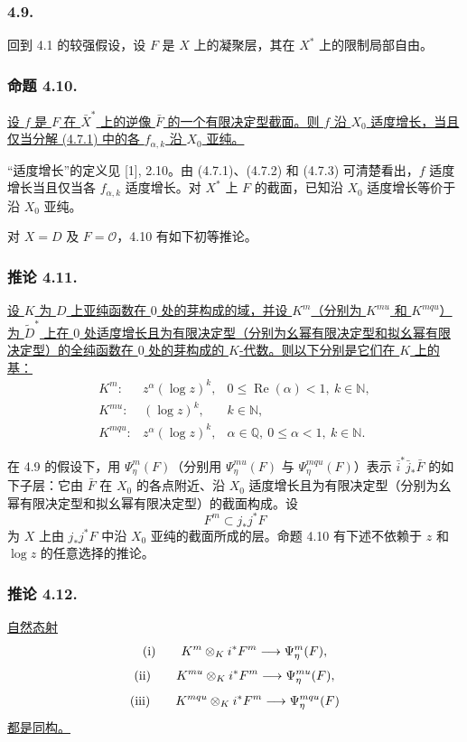 \subsubsection*{4.9.}
回到 4.1 的较强假设，设 $F$ 是 $X$ 上的凝聚层，其在 $X^*$ 上的限制局部自由。

\subsubsection*{命题 4.10.}
\underline{设 $f$ 是 $F$ 在 $\bar X^*$ 上的逆像 $\bar F$ 的一个有限决定型截面。则 $f$ 沿 $X_0$ 适度增长，当且仅当分解 (4.7.1) 中的各 $f_{\alpha,k}$ 沿 $X_0$ 亚纯。}

“适度增长”的定义见 [1], 2.10。由 (4.7.1)、(4.7.2) 和 (4.7.3) 可清楚看出，$f$ 适度增长当且仅当各 $f_{\alpha,k}$ 适度增长。对 $X^*$ 上 $F$ 的截面，已知沿 $X_0$ 适度增长等价于沿 $X_0$ 亚纯。

对 $X=D$ 及 $F=\mathcal O$，4.10 有如下初等推论。

\subsubsection*{推论 4.11.}
\underline{设 $K$ 为 $D$ 上亚纯函数在 $0$ 处的芽构成的域，并设 $K^m$（分别为 $K^{mu}$ 和 $K^{mqu}$）为 $\widetilde D^*$ 上在 $0$ 处适度增长且为有限决定型（分别为幺幂有限决定型和拟幺幂有限决定型）的全纯函数在 $0$ 处的芽构成的 $K$-代数。则以下分别是它们在 $K$ 上的基：}
\[
\begin{array}{lll}
K^m:&z^\alpha(\log z)^k,
  &0\leq\operatorname{Re}(\alpha)<1,\ k\in\mathbb N,\\[2pt]
K^{mu}:&(\log z)^k,&k\in\mathbb N,\\[2pt]
K^{mqu}:&z^\alpha(\log z)^k,
  &\alpha\in\mathbb Q,\ 0\leq\alpha<1,\ k\in\mathbb N.
\end{array}
\]

在 4.9 的假设下，用 $\Psi_\eta^m(F)$（分别用 $\Psi_\eta^{mu}(F)$ 与 $\Psi_\eta^{mqu}(F)$）表示 $\bar i^*\bar j_*\bar F$ 的如下子层：它由 $\bar F$ 在 $X_0$ 的各点附近、沿 $X_0$ 适度增长且为有限决定型（分别为幺幂有限决定型和拟幺幂有限决定型）的截面构成。设
\[
F^m\subset j_*j^*F
\]
为 $X$ 上由 $j_*j^*F$ 中沿 $X_0$ 亚纯的截面所成的层。命题 4.10 有下述不依赖于 $z$ 和 $\log z$ 的任意选择的推论。

\subsubsection*{推论 4.12.}
\underline{自然态射}
\[
\textup{(i)}\qquad
K^m\otimes_K i^*F^m\longrightarrow\Psi_\eta^m(F),
\]
\[
\textup{(ii)}\qquad
K^{mu}\otimes_K i^*F^m\longrightarrow\Psi_\eta^{mu}(F),
\]
\[
\textup{(iii)}\qquad
K^{mqu}\otimes_K i^*F^m\longrightarrow\Psi_\eta^{mqu}(F)
\]
\underline{都是同构。}

